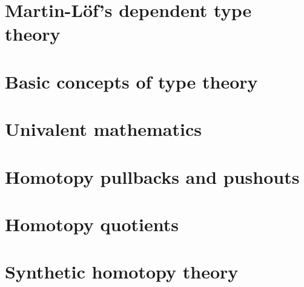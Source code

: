 \documentclass[10pt]{memoir} %
\begin{document}
\mainmatter

\renewcommand{\thechapter}{\Roman{chapter}}

\chapter{Martin-L\"of's dependent type theory}






%

\chapter{Basic concepts of type theory}






\chapter{Univalent mathematics}






\chapter{Homotopy pullbacks and pushouts}






\chapter{Homotopy quotients}


%





\chapter{Synthetic homotopy theory}




%


\backmatter

\printbibliography

\printindex
\end{document}
